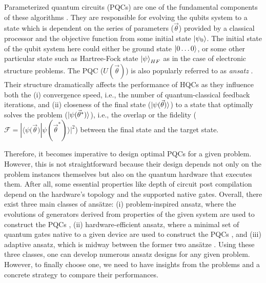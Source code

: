 Parameterized quantum circuits (PQCs) are one of the fundamental components of these algorithms \cite{Benedetti2019-gz}. They are responsible for evolving the qubits system to a state which is dependent on the series of parameters ($\vec{\theta}$) provided by a classical processor and the objective function from some initial state $\ket{\psi_0}$. The initial state of the qubit system here could either be ground state $\ket{0\ldots0}$, or some other particular state such as Hartree-Fock state $\ket{\psi}_{HF}$ as in the case of electronic structure problems. The PQC ($U(\vec{\theta})$) is also popularly referred to as \textit{ansatz} \cite{Benedetti2019-gz}. Their structure dramatically affects the performance of HQCs as they influence both the (i) convergence speed, i.e., the number of quantum-classical feedback iterations, and (ii) closeness of the final state ($\ket{\psi({\vec{\theta}})}$) to a state that optimally solves the problem ($\ket{\psi({\vec{\theta}^*})}$), i.e., the overlap or the fidelity ($\mathcal{F} = |\langle\psi({\vec{\theta})} | \psi({\vec{\theta}^*})\rangle|^{2}$) \cite{9781107002173} between the final state and the target state. 

Therefore, it becomes imperative to design optimal PQCs for a given problem. However, this is not straightforward because their design depends not only on the problem instances themselves but also on the quantum hardware that executes them. After all, some essential properties like depth of circuit post compilation depend on the hardware's topology and the supported native gates. Overall, there exist three main classes of ansätze: (i) problem-inspired ansatz, where the evolutions of generators derived from properties of the given system are used to construct the PQCs \cite{Romero2018-uc}, (ii) hardware-efficient ansatz, where a minimal set of quantum gates native to a given device are used to construct the PQCs \cite{Kandala2017-wn}, and (iii) adaptive ansatz, which is midway between the former two ansätze \cite{PRXQuantum.2.020310}. Using these three classes, one can develop numerous ansatz designs for any given problem. However, to finally choose one, we need to have insights from the problems and a concrete strategy to compare their performances.

